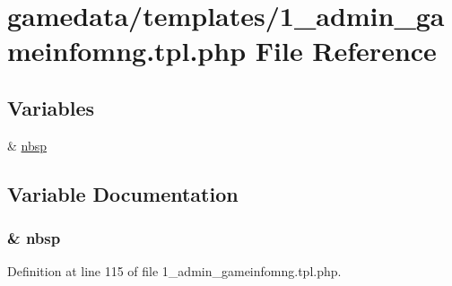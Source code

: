 \hypertarget{1__admin__gameinfomng_8tpl_8php}{\section{gamedata/templates/1\+\_\+admin\+\_\+gameinfomng.tpl.\+php File Reference}
\label{1__admin__gameinfomng_8tpl_8php}
}
\subsection*{Variables}
\begin{DoxyCompactItemize}
\item 
\& \hyperlink{1__admin__gameinfomng_8tpl_8php_aef915316f784c9063d942974538301a6}{nbsp}
\end{DoxyCompactItemize}


\subsection{Variable Documentation}
\hypertarget{1__admin__gameinfomng_8tpl_8php_aef915316f784c9063d942974538301a6}{
\subsubsection[{nbsp}]{\setlength{\rightskip}{0pt plus 5cm}\& nbsp}}\label{1__admin__gameinfomng_8tpl_8php_aef915316f784c9063d942974538301a6}


Definition at line 115 of file 1\+\_\+admin\+\_\+gameinfomng.\+tpl.\+php.

